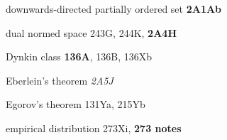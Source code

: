 downwards-directed partially ordered set
{\bf 2A1Ab}





















dual normed space 243G, 244K, {\bf 2A4H}





























Dynkin class {\bf 136A}, 136B, 136Xb




\indexmedskip



Eberlein's theorem {\it 2A5J}















Egorov's theorem 131Ya, 215Yb
  





















empirical distribution 273Xi, {\bf 273 notes}















